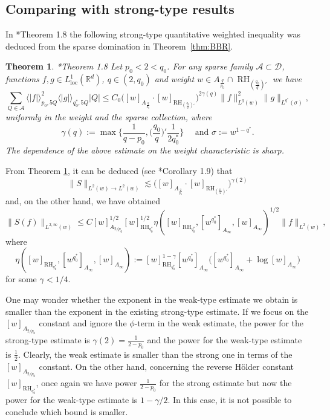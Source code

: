 \documentclass[11pt,reqno]{amsart}
\theoremstyle{plain} %
\newtheorem{theorem}[equation]{Theorem}
\newcommand{\1}{ \mathbbm{1}}   %
\theoremstyle{definition}
\theoremstyle{remark}
\numberwithin{equation}{section}
\begin{document}
\subsection{Comparing with strong-type results}

In \cite{BBR}*{Theorem 1.8} the following strong-type quantitative weighted inequality was deduced from the sparse domination in Theorem~\ref{thm:BBR}.

\begin{theorem}{\cite{BBR}*{Theorem 1.8}} 
\label{thm:BBR2}
Let $p_0<2<q_0$. For any sparse family $\mathcal{A}\subset \mathcal{D}$, functions $f,g\in L_{\operatorname{loc}}^1(\mathbb{R}^d)$, $q\in (2,q_0)$ and weight $w\in A_{\frac{q}{p_0}}\cap \operatorname{RH}_{(\frac{q_0}{q})'}$ we have
$$
\sum_{Q\in \mathcal{A}}\langle |f|\rangle_{p_0, 5Q}^2\langle |g|\rangle_{q_0^*, 5Q}|Q|\le C_0\big([w]_{A_{\frac{q}{p_0}}}\cdot [w]_{\operatorname{RH}_{(\frac{q_0}{q})'}}\big)^{2\gamma(q)}\|f\|_{L^q(w)}^2\|g\|_{L^{q^*}(\sigma)},
$$
uniformly in the weight and the sparse collection, where 
$$
\gamma(q):=\max\Big\{\frac{1}{q-p_0},\big(\frac{q_0}{q}\big)'\frac{1}{2q_0^*}\Big\}\quad \text{ and } \sigma:=w^{1-q^*}.
$$
The dependence of the above estimate on the weight characteristic is sharp.
\end{theorem}

From Theorem \ref{thm:BBR2}, it can be deduced (see \cite{BBR}*{Corollary 1.9}) that 
$$
\|S\|_{L^2(w)\to L^2(w)}\lesssim \big([w]_{A_{\frac{2}{p_0}}}\cdot [w]_{\operatorname{RH}_{(\frac{q_0}{2})'}}\big)^{\gamma(2)}
$$
and, on the other hand, we have obtained
$$
\|S(f)\|_{L^{2,\infty}(w)} \le C [w]_{A_{2/p_0}}^{1/2} [w]_{ \operatorname{RH}_{q_0^*}}^{1/2}\eta([w]_{ \operatorname{RH}_{q_0^*}}, [w^{q_0^*}]_{A_{\infty}},[w]_{A_{\infty}})^{1/2}\|f\|_{L^2(w)},
$$
where  
\begin{equation*}
\eta ([w]_{ \operatorname{RH}_{q_0^*}},[w^{q_0^*}]_{A_{\infty}}, [w]_{A_{\infty}}) := [w]_{ \operatorname{RH}_{q_0^*}}^{1-\gamma}   [w^{q_0^*}]_{A_{\infty}} \big(  [w^{q_0^*}]_{A_{\infty}} +\log[w]_{A_{\infty}}\big)
\end{equation*}
for some $\gamma<1/4$.

One may wonder whether the exponent in the weak-type estimate we obtain is smaller than the exponent in the existing strong-type estimate. If we focus on the $[w]_{A_{2/p_0}}$ constant and ignore the $\phi$-term in the weak estimate, the power for the strong-type estimate is $\gamma(2)=\frac{1}{2-p_0}$ and the power for the weak-type estimate is $\frac{1}{2}$. Clearly, the weak estimate is smaller than the strong one in terms of the $[w]_{A_{2/p_0}}$ constant. On the other hand, concerning the reverse H\"older constant $[w]_{ \operatorname{RH}_{q_0^*}}$, once again we have power $\frac{1}{2-p_0}$ for the strong estimate but now the power for the weak-type estimate is $1-\gamma/2$. In this case, it is not possible to conclude which bound is smaller. 
\end{document}
